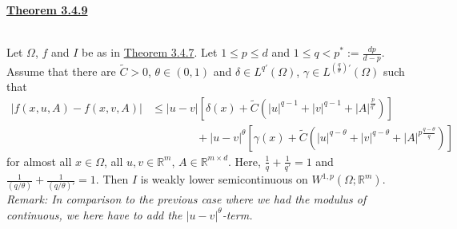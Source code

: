 \hypertarget{theorem_3_4_9}{\textbf{\underline{Theorem 3.4.9}}}\\
Let $\Omega$, $f$ and $I$ be as in \hyperlink{theorem_3_4_7}{Theorem 3.4.7}. Let $1\leq p\leq d$ and $1\leq q<p^*:=\frac{dp}{d-p}$. Assume that there are $\widetilde{C}>0$, $\theta\in(0,1)$ and $\delta\in L^{q'}(\Omega)$, $\gamma\in L^{(\frac{q}{\theta})'}(\Omega)$ such that
\begin{align*}
	\lvert f(x,u,A)-f(x,v,A)\rvert&\leq\lvert u-v\rvert\left[\delta(x)+\widetilde{C}\left(\lvert u\rvert^{q-1}+\lvert v\rvert^{q-1}+\lvert A\rvert^{\frac{p}{q'}}\right)\right]\\
	&\qquad\qquad+\lvert u-v\rvert^\theta\left[\gamma(x)+\widetilde{C}\left(\lvert u\rvert^{q-\theta}+\lvert v\rvert^{q-\theta}+\lvert A\rvert^{p\frac{q-\theta}{q}}\right)\right]
\end{align*}
for almost all $x\in\Omega$, all $u,v\in\mathbb{R}^m$, $A\in\mathbb{R}^{m\times d}$. Here, $\frac{1}{q}+\frac{1}{q'}=1$ and $\frac{1}{(q/\theta)}+\frac{1}{(q/\theta)'}=1$. Then $I$ is weakly lower semicontinuous on $W^{1,p}(\Omega;\mathbb{R}^m)$.\\

\textit{Remark: In comparison to the previous case where we had the modulus of continuous, we here have to add the $\lvert u-v\rvert^\theta$-term.}\\

